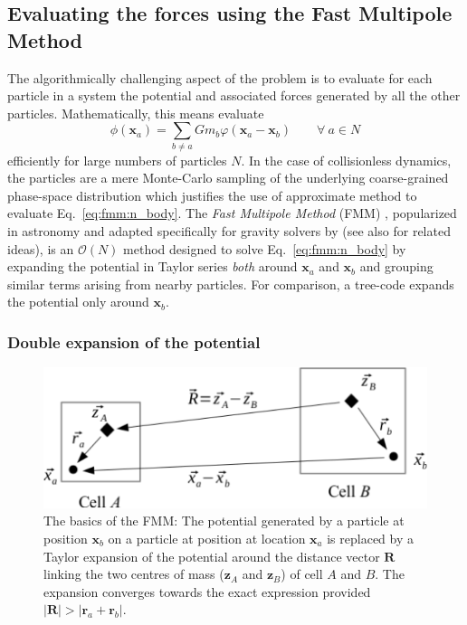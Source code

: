 \subsection{Evaluating the forces using the Fast Multipole Method}
\label{ssec:fmm_summary}

The algorithmically challenging aspect of the \nbody problem is to
evaluate for each particle in a system the potential and associated
forces generated by all the other particles. Mathematically, this means
evaluate
\begin{equation}
  \phi(\mathbf{x}_a) = \sum_{b \neq a} G m_b\varphi(\mathbf{x}_a -
  \mathbf{x}_b)\qquad \forall~a\in N
  \label{eq:fmm:n_body}
\end{equation}
efficiently for large numbers of particles $N$. In the case of
collisionless dynamics, the particles are a mere Monte-Carlo sampling
of the underlying coarse-grained phase-space distribution which
justifies the use of approximate method to evaluate
Eq.~\ref{eq:fmm:n_body}. The \emph{Fast Multipole Method} (FMM)
\citep{Greengard1987, Cheng1999}, popularized in astronomy and adapted
specifically for gravity solvers by \cite{Dehnen2000, Dehnen2002} (see
also \cite{Warren1995} for related ideas), is an $\mathcal{O}(N)$
method designed to solve Eq.~\ref{eq:fmm:n_body} by expanding the
potential in Taylor series \emph{both} around $\mathbf{x}_a$ and
$\mathbf{x}_b$ and grouping similar terms arising from nearby
particles. For comparison, a \cite{Barnes1986} tree-code expands the
potential only around $\mathbf{x}_b$.

\subsubsection{Double expansion of the potential}

\begin{figure}
\includegraphics[width=\columnwidth]{cells.pdf}
\caption{The basics of the FMM: The potential generated by a particle
  at position $\mathbf{x}_b$ on a particle at position at location
  $\mathbf{x}_a$ is replaced by a Taylor expansion of the potential
  around the distance vector $\mathbf{R}$ linking the two centres of mass
  ($\mathbf{z}_A$ and $\mathbf{z}_B$) of cell $A$ and $B$. The
  expansion converges towards the exact expression provided
  $|\mathbf{R}|>|\mathbf{r}_a + \mathbf{r}_b|$.}
\label{fig:fmm:cells}
\end{figure}

